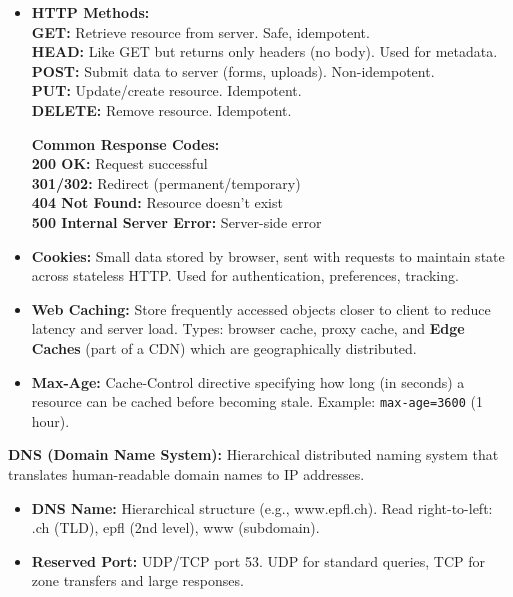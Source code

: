 \begin{minipage}[htp]{0.5\textwidth}
\begin{itemize}[noitemsep,nolistsep,topsep=0px,partopsep=0pt,parsep=0pt]
        \item[] \begin{minipage}[htp]{0.48\textwidth}
            \textbf{HTTP Methods:}\\
 \textbf{GET:} Retrieve resource from server. Safe, idempotent.\\
\textbf{HEAD:} Like GET but returns only headers (no body). Used for metadata.\\
 \textbf{POST:} Submit data to server (forms, uploads). Non-idempotent.\\
 \textbf{PUT:} Update/create resource. Idempotent.\\
 \textbf{DELETE:} Remove resource. Idempotent.
        \end{minipage}
        \hfill
        \begin{minipage}[htp]{0.48\textwidth}
        \textbf{Common Response Codes:}\\
 \textbf{200 OK:} Request successful\\
 \textbf{301/302:} Redirect (permanent/temporary)\\
 \textbf{404 Not Found:} Resource doesn't exist\\
 \textbf{500 Internal Server Error:} Server-side error
        \end{minipage}
        \item[-] \textbf{Cookies:} Small data stored by browser, sent with requests to maintain state across stateless HTTP. Used for authentication, preferences, tracking.
        \item[-] \textbf{Web Caching:} Store frequently accessed objects closer to client to reduce latency and server load. Types: browser cache, proxy cache, and \textbf{Edge Caches} (part of a CDN) which are geographically distributed.
        \item[-] \textbf{Max-Age:} Cache-Control directive specifying how long (in seconds) a resource can be cached before becoming stale. Example: \texttt{max-age=3600} (1 hour).
    \end{itemize}    
    \noindent\textbf{DNS (Domain Name System):} Hierarchical distributed naming system that translates human-readable domain names to IP addresses.
    \begin{itemize}[noitemsep,nolistsep,topsep=0px,partopsep=0pt,parsep=0pt]
        \item[-] \textbf{DNS Name:} Hierarchical structure (e.g., www.epfl.ch). Read right-to-left: .ch (TLD), epfl (2nd level), www (subdomain).
        \item[-] \textbf{Reserved Port:} UDP/TCP port 53. UDP for standard queries, TCP for zone transfers and large responses.

\end{itemize}
\end{minipage}
